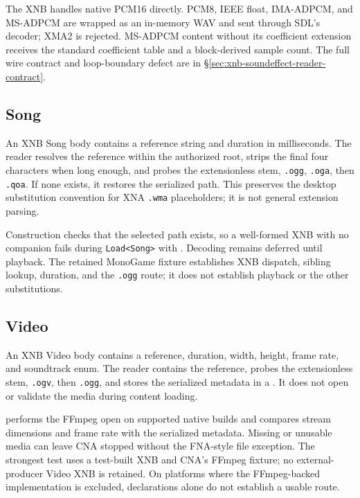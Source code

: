 The XNB  handles native PCM16 directly. PCM8, IEEE float, IMA-ADPCM,
and MS-ADPCM are wrapped as an in-memory WAV and sent through SDL's decoder; XMA2 is rejected.
MS-ADPCM content without its coefficient extension receives the standard coefficient table and
a block-derived sample count. The full wire contract and loop-boundary defect are in
\S\ref{sec:xnb-soundeffect-reader-contract}.

\subsection{Song}
\label{sec:xnb-song-reader}

An XNB Song body contains a reference string and duration in milliseconds. The reader resolves
the reference within the authorized root, strips the final four characters when long enough,
and probes the extensionless stem, \texttt{.ogg}, \texttt{.oga}, then \texttt{.qoa}. If none
exists, it restores the serialized path. This preserves the desktop substitution convention for
XNA \texttt{.wma} placeholders; it is not general extension parsing.

Construction checks that the selected path exists, so a well-formed XNB with no companion fails
during \texttt{Load<Song>} with . Decoding remains deferred until
playback. The retained MonoGame fixture establishes XNB dispatch, sibling lookup, duration, and
the \texttt{.ogg} route; it does not establish playback or the other substitutions.

\subsection{Video}
\label{sec:xnb-video-reader}

An XNB Video body contains a reference, duration, width, height, frame rate, and soundtrack enum.
The reader contains the reference, probes the extensionless stem, \texttt{.ogv}, then
\texttt{.ogg}, and stores the serialized metadata in a . It does not open or
validate the media during content loading.

 performs the FFmpeg open on supported native builds and compares
stream dimensions and frame rate with the serialized metadata. Missing or unusable media can
leave CNA stopped without the FNA-style file exception. The strongest test uses a test-built XNB
and CNA's FFmpeg fixture; no external-producer Video XNB is retained. On platforms where the
FFmpeg-backed implementation is excluded, declarations alone do not establish a usable route.

